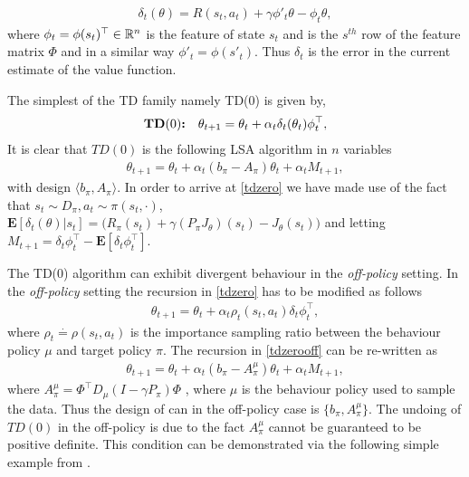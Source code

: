 \begin{align}\label{td}
\delta_t(\theta)=R(s_t,a_t)+\gamma \phi'_t\theta-\phi_t\theta,
\end{align}
where $\phi_t=\phi(s_t)^\top \in \mathbb{R}^n$ is the feature of state $s_t$ and is the $s^{th}$ row of the feature matrix $\Phi$ and in a similar way $\phi'_t=\phi(s'_t)$. Thus $\delta_t$ is the error in the current estimate of the value function.\par
The simplest of the TD family namely TD($0$) is given by,
\begin{align}\label{tdzero}
&\textbf{TD$(0)$:}&\theta_{t+1}=\theta_t+\alpha_t\delta_t(\theta_t)\phi_t^\top,
\end{align}
It is clear that $TD(0)$ is the following LSA algorithm in $n$ variables
\begin{align}\label{tdzero}
\theta_{t+1}=\theta_t+\alpha_t(b_\pi-A_\pi)\theta_t+\alpha_t M_{t+1},
\end{align} 
with design $\langle b_\pi,A_\pi \rangle$. In order to arrive at \eqref{tdzero} we have made use of the fact that $s_t\sim D_\pi, a_t\sim\pi(s_t,\cdot)$, $\mathbf{E}[\delta_t(\theta)|s_t]= \big(R_\pi(s_t)+\gamma (P_\pi J_\theta)(s_t) -J_\theta(s_t)\big)$ and letting $M_{t+1}=\delta_t\phi_t^\top-\mathbf{E}[\delta_t\phi_t^\top]$.\par
The TD($0$) algorithm can exhibit divergent behaviour in the \emph{off-policy} setting. In the \emph{off-policy} setting the recursion in \eqref{tdzero} has to be modified as follows
\begin{align}\label{tdzerooff}
\theta_{t+1}=\theta_t+\alpha_t\rho_t(s_t,a_t)\delta_t\phi_t^\top,
\end{align}
where $\rho_t\stackrel{\cdot}{=}\rho(s_t,a_t)$ is the importance sampling ratio between the behaviour policy $\mu$ and target policy $\pi$. The recursion in \eqref{tdzerooff} can be re-written as
\begin{align}\label{tdzerooffsa}
\theta_{t+1}=\theta_t+\alpha_t(b_\pi-A^\mu_\pi)\theta_t+\alpha_t M_{t+1},
\end{align}
where $A^{\mu}_\pi=\Phi^\top D_\mu (I-\gamma P_\pi)\Phi$ , where $\mu$ is the behaviour policy used to sample the data. Thus the design of \tdo can in the off-policy case is $\{b_\pi,A^\mu_\pi\}$.
The undoing of $TD(0)$ in the off-policy is due to the fact $A^\mu_\pi$ cannot be guaranteed to be positive definite. This condition can be demonstrated via the following simple example from \cite{}.
